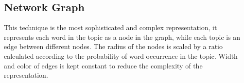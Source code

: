 \subsection{Network Graph}
This technique is the most sophisticated and complex representation, it represents each word in the topic as a node in the graph, while each topic is an
edge between different nodes. The radius of the nodes is scaled by a ratio calculated according to the probability of word occurrence in the topic. Width and
color of edges is kept constant to reduce the complexity of the representation.
